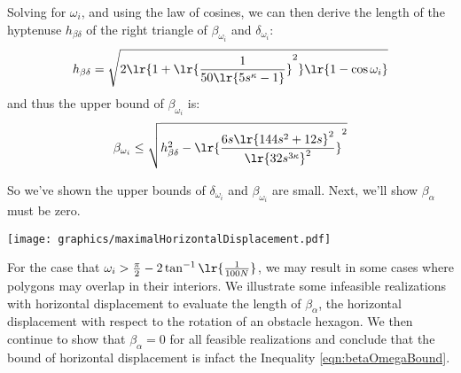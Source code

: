 Solving for $\omega_i$, and using the law of cosines, we can then derive the length of the hyptenuse $h_{\beta \delta}$ of the right triangle of $\beta_{\omega_i}$ and $\delta_{\omega_i}$:
$$h_{\beta \delta} = \sqrt{2\lr{1 + \lr{ \frac{1}{50 \lr{5s^\kappa -1 }} }^2 } \lr{1 -  \cos \omega_i } }$$
and thus the upper bound of $\beta_{\omega_i}$ is:
$$\beta_{\omega_i} \leq \sqrt{h_{\beta \delta}^2 - \lr{\frac{6s\lr{144s^2+12s}^2}{\lr{32s^{3\kappa}}^2}  }^2} $$

So we've shown the upper bounds of $\delta_{\omega_i}$ and $\beta_{\omega_i}$ are small.    
Next, we'll show $\beta_{\alpha}$ must be zero.  


\begin{minipage}{\linewidth}
\begin{center}
\texttt{[image: graphics/maximalHorizontalDisplacement.pdf]}
\label{fig:maximalHorizontalDisplacement.pdf}
\end{center}
\end{minipage}

For the case that $\omega_i > \frac{\pi}{2}-2 \tan^{-1} \lr{\frac{1}{100N}}$, we may result in some cases where polygons may overlap in their interiors. 
We illustrate some infeasible realizations with horizontal displacement to evaluate the length of $\beta_\alpha$, the horizontal displacement with respect to the rotation of an obstacle hexagon.  
We then continue to show that $\beta_\alpha = 0$ for all feasible realizations and conclude that the bound of horizontal displacement is infact the Inequality \ref{eqn:betaOmegaBound}. 

